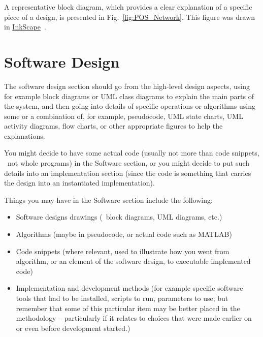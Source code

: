 A representative block diagram, which provides a clear explanation of a specific piece of a design, is presented in Fig.~\ref{fig:POS_Network}.  This figure was drawn in \href{http://www.inkscape.org/}{InkScape}~\cite{InkScape}.



\section{Software Design}

The software design section should go from the high-level design aspects, using for example block diagrams or UML class diagrams to explain the main parts of the system, and then going into details of specific operations or algorithms using some or a combination of, for example, pseudocode, UML state charts, UML activity diagrams, flow charts, or other appropriate figures to help the explanations.

You might decide to have some actual code (usually not more than code snippets, \ie~not whole programs) in the Software section, or you might decide to put such details into an implementation section (since the code is something that carries the design into an instantiated implementation).

Things you may have in the Software section include the following:

\begin{itemize}
	\item Software designs drawings (\eg~block diagrams, UML diagrams, etc.)
	\item Algorithms (maybe in pseudocode, or actual code such as MATLAB)
	\item Code snippets (where relevant, used to illustrate how you went from algorithm, or an element of the software design, to executable implemented code)
	\item Implementation and development methods (for example specific software tools that had to be installed, scripts to run, parameters to use; but remember that some of this particular item may be better placed in the methodology -- particularly if it relates to choices that were made earlier on or even before development started.)
\end{itemize}

